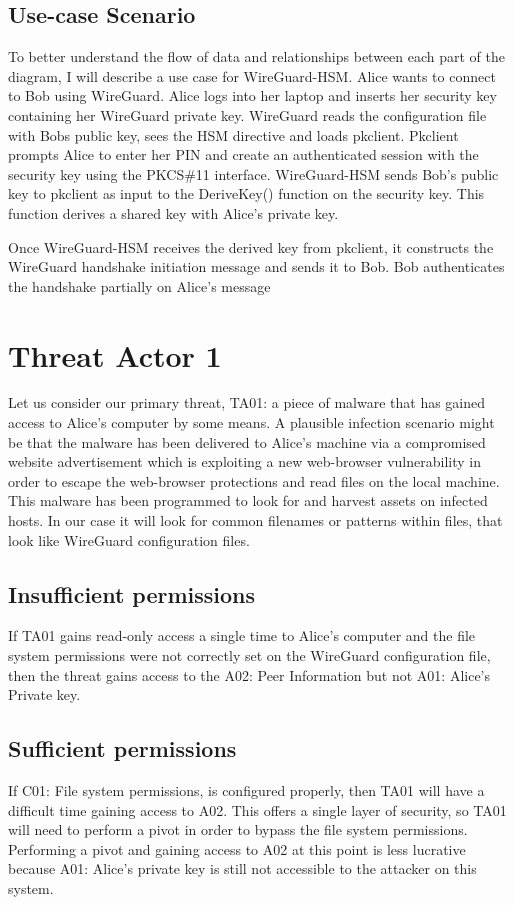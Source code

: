 \documentclass [11pt, proquest] {uwthesis}[2020/02/24]
\begin{document}
\subsection{Use-case Scenario}
To better understand the flow of data and relationships between each part of the diagram, I will describe a use case for WireGuard-HSM.
Alice wants to connect to Bob using WireGuard. Alice logs into her laptop and inserts her security key containing her WireGuard private key. WireGuard reads the configuration file with Bobs public key, sees the HSM directive and loads pkclient. Pkclient prompts Alice to enter her PIN and create an authenticated session with the security key using the PKCS\#11 interface. WireGuard-HSM sends Bob's public key to pkclient as input to the DeriveKey() function on the security key. This function derives a shared key with Alice's private key.

Once WireGuard-HSM receives the derived key from pkclient, it constructs the WireGuard handshake initiation message and sends it to Bob. Bob authenticates the handshake partially on Alice's message

\section{Threat Actor 1}
Let us consider our primary threat, TA01: a piece of malware that has gained access to Alice's computer by some means. A plausible infection scenario might be that the malware has been delivered to Alice's machine via a compromised website advertisement which is exploiting a new web-browser vulnerability in order to escape the web-browser protections and read files on the local machine.  This malware has been programmed to look for and harvest assets on infected hosts. In our case it will look for common filenames or patterns within files, that look like WireGuard configuration files.  

\subsection{Insufficient permissions}
If TA01 gains read-only access a single time to Alice's computer and the file system permissions were not correctly set on the WireGuard configuration file, then the threat gains access to the A02: Peer Information but not A01: Alice's Private key.

\subsection{Sufficient permissions}
If C01: File system permissions, is configured properly, then TA01 will have a difficult time gaining access to A02. This offers a single layer of security, so TA01 will need to perform a pivot in order to bypass the file system permissions. Performing a pivot and gaining access to A02 at this point is less lucrative because A01: Alice's private key is still not accessible to the attacker on this system.
\end{document}
